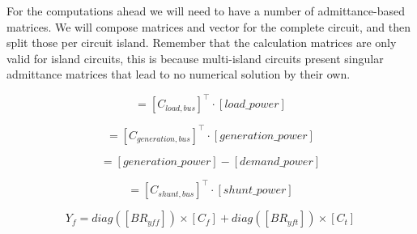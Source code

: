 \documentclass[nols,a4paper,twoside,notoc,fleqn]{tufte-book}
\begin{document}
For the computations ahead we will need to have a number of admittance-based matrices. We will compose matrices and vector for the complete circuit, and then split those per circuit island. Remember that the calculation matrices are only valid for island circuits, this is because multi-island circuits present singular admittance matrices that lead to no numerical solution by their own.

%
%
%
%



\begin{equation}
[demand\_power ]= [C_{load,bus}]^\top \cdot [load\_power]
\end{equation}

\begin{equation}
[generation\_power ]= [C_{generation,bus}]^\top \cdot [generation\_power]
\end{equation}

\begin{equation}
[S_{bus}] = [generation\_power]  - [demand\_power]
\end{equation}

\begin{equation}
[Ysh ]= [C_{shunt,bus}]^\top \cdot [shunt\_power]
\end{equation}

\begin{equation}
Y_f = diag([BR_{yff}]) \times [C_f] + diag([BR_{yft}]) \times [C_t]
\end{equation}
\end{document}
